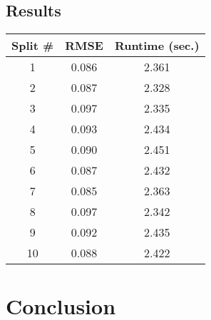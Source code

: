 \documentclass{article}
\begin{document}
\subsection{Results}


\begin{center} 
    \begin{tabular}{ | c |  c |  c |} 
        \hline
        Split \# & RMSE & Runtime (sec.) \\ 
        \hline\hline
        1 & 0.086 & 2.361 \\ 
        \hline 
        2 & 0.087 & 2.328 \\ 
        \hline 
        3 & 0.097 & 2.335 \\ 
        \hline 
        4 & 0.093 & 2.434 \\ 
        \hline 
        5 & 0.090 & 2.451 \\ 
        \hline 
        6 & 0.087 & 2.432 \\ 
        \hline
         7 & 0.085 & 2.363 \\ 
         \hline 
        8 & 0.097 & 2.342 \\ 
        \hline 
        9 & 0.092 & 2.435 \\ 
        \hline
        10 & 0.088 & 2.422 \\ 
        \hline 
    \end{tabular} 
\end{center}

\section{Conclusion}
\end{document}
